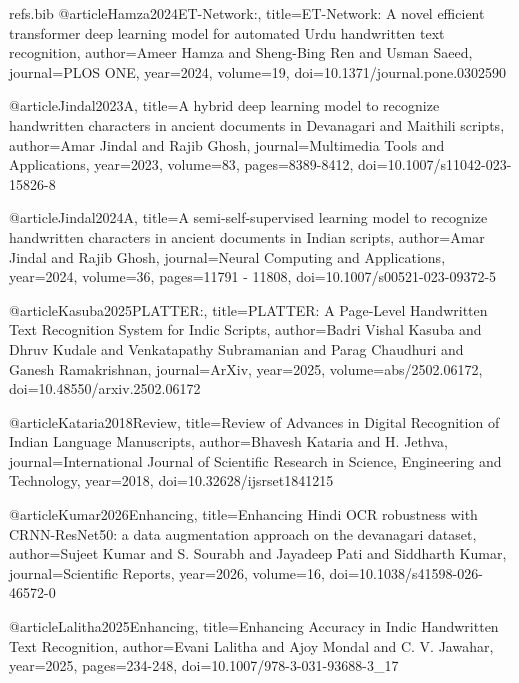 \begin{filecontents}{refs.bib}
    @article{Hamza2024ET-Network:,
    title={ET-Network: A novel efficient transformer deep learning model for automated Urdu handwritten text recognition},
    author={Ameer Hamza and Sheng-Bing Ren and Usman Saeed},
    journal={PLOS ONE},
    year={2024},
    volume={19},
    doi={10.1371/journal.pone.0302590}
    }
    
    @article{Jindal2023A,
    title={A hybrid deep learning model to recognize handwritten characters in ancient documents in Devanagari and Maithili scripts},
    author={Amar Jindal and Rajib Ghosh},
    journal={Multimedia Tools and Applications},
    year={2023},
    volume={83},
    pages={8389-8412},
    doi={10.1007/s11042-023-15826-8}
    }
    
    @article{Jindal2024A,
    title={A semi-self-supervised learning model to recognize handwritten characters in ancient documents in Indian scripts},
    author={Amar Jindal and Rajib Ghosh},
    journal={Neural Computing and Applications},
    year={2024},
    volume={36},
    pages={11791 - 11808},
    doi={10.1007/s00521-023-09372-5}
    }
    
    @article{Kasuba2025PLATTER:,
    title={PLATTER: A Page-Level Handwritten Text Recognition System for Indic Scripts},
    author={Badri Vishal Kasuba and Dhruv Kudale and Venkatapathy Subramanian and Parag Chaudhuri and Ganesh Ramakrishnan},
    journal={ArXiv},
    year={2025},
    volume={abs/2502.06172},
    doi={10.48550/arxiv.2502.06172}
    }
    
    @article{Kataria2018Review,
    title={Review of Advances in Digital Recognition of Indian Language Manuscripts},
    author={Bhavesh Kataria and H. Jethva},
    journal={International Journal of Scientific Research in Science, Engineering and Technology},
    year={2018},
    doi={10.32628/ijsrset1841215}
    }
    
    @article{Kumar2026Enhancing,
    title={Enhancing Hindi OCR robustness with CRNN-ResNet50: a data augmentation approach on the devanagari dataset},
    author={Sujeet Kumar and S. Sourabh and Jayadeep Pati and Siddharth Kumar},
    journal={Scientific Reports},
    year={2026},
    volume={16},
    doi={10.1038/s41598-026-46572-0}
    }
    
    @article{Lalitha2025Enhancing,
    title={Enhancing Accuracy in Indic Handwritten Text Recognition},
    author={Evani Lalitha and Ajoy Mondal and C. V. Jawahar},
    year={2025},
    pages={234-248},
    doi={10.1007/978-3-031-93688-3_17}
    }
    

\end{filecontents}
